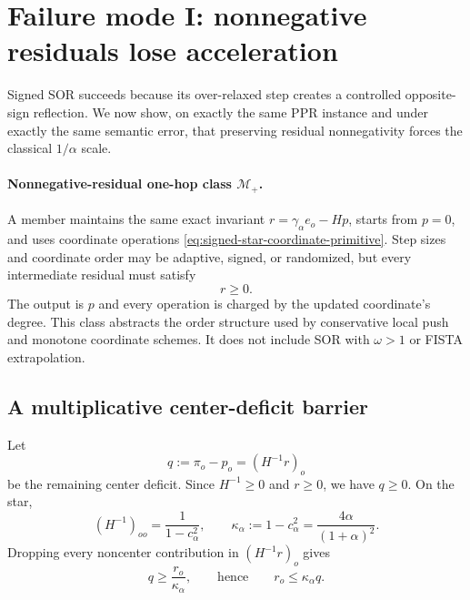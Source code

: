 \section{Failure mode I: nonnegative residuals lose acceleration}
\label{sec:signed-star-monotone-failure}

Signed SOR succeeds because its over-relaxed step creates a controlled
opposite-sign reflection.  We now show, on exactly the same PPR instance and
under exactly the same semantic error, that preserving residual nonnegativity
forces the classical $1/\alpha$ scale.

\paragraph{Nonnegative-residual one-hop class $\mathcal M_+$.}
A member maintains the same exact invariant
$r=\gamma_\alpha e_o-Hp$, starts from $p=0$, and uses coordinate operations
\eqref{eq:signed-star-coordinate-primitive}.  Step sizes and coordinate order
may be adaptive, signed, or randomized, but every intermediate residual must
satisfy
\begin{equation}
  r\ge0.
  \label{eq:signed-star-nonnegative-residual}
\end{equation}
The output is $p$ and every operation is charged by the updated coordinate's
degree.  This class abstracts the order structure used by conservative local
push and monotone coordinate schemes.  It does not include SOR with
$\omega>1$ or FISTA extrapolation.

\subsection{A multiplicative center-deficit barrier}

Let
\begin{equation}
  q:=\pi_o-p_o=(H^{-1}r)_o
  \label{eq:signed-star-center-deficit}
\end{equation}
be the remaining center deficit.  Since $H^{-1}\ge0$ and $r\ge0$, we have
$q\ge0$.  On the star,
\begin{equation}
  (H^{-1})_{oo}=\frac{1}{1-c_\alpha^2},
  \qquad
  \kappa_\alpha:=1-c_\alpha^2
     =\frac{4\alpha}{(1+\alpha)^2}.
  \label{eq:signed-star-kappa}
\end{equation}
Dropping every noncenter contribution in $(H^{-1}r)_o$ gives
\begin{equation}
  q\ge\frac{r_o}{\kappa_\alpha},
  \qquad\text{hence}\qquad
  r_o\le\kappa_\alpha q.
  \label{eq:signed-star-center-residual-deficit}
\end{equation}

